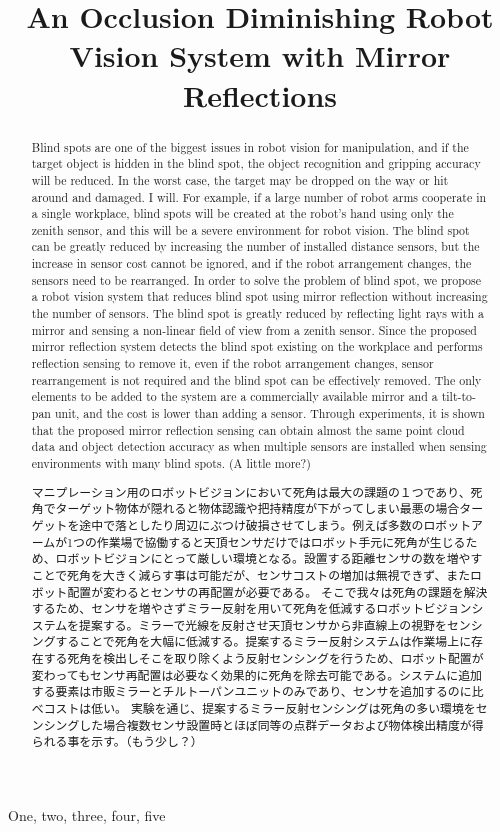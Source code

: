 \documentclass[xelatex,ja=standard]{bxjsarticle}
\title{An Occlusion Diminishing Robot Vision System with Mirror Reflections}
\begin{document}
\ninept
%
\maketitle
%
\begin{abstract}
Blind spots are one of the biggest issues in robot vision for manipulation, and if the target object is hidden in the blind spot, the object recognition and gripping accuracy will be reduced. In the worst case, the target may be dropped on the way or hit around and damaged. I will. For example, if a large number of robot arms cooperate in a single workplace, blind spots will be created at the robot's hand using only the zenith sensor, and this will be a severe environment for robot vision. The blind spot can be greatly reduced by increasing the number of installed distance sensors, but the increase in sensor cost cannot be ignored, and if the robot arrangement changes, the sensors need to be rearranged.
In order to solve the problem of blind spot, we propose a robot vision system that reduces blind spot using mirror reflection without increasing the number of sensors. The blind spot is greatly reduced by reflecting light rays with a mirror and sensing a non-linear field of view from a zenith sensor. Since the proposed mirror reflection system detects the blind spot existing on the workplace and performs reflection sensing to remove it, even if the robot arrangement changes, sensor rearrangement is not required and the blind spot can be effectively removed. The only elements to be added to the system are a commercially available mirror and a tilt-to-pan unit, and the cost is lower than adding a sensor.
Through experiments, it is shown that the proposed mirror reflection sensing can obtain almost the same point cloud data and object detection accuracy as when multiple sensors are installed when sensing environments with many blind spots. (A little more?)

マニプレーション用のロボットビジョンにおいて死角は最大の課題の１つであり、死角でターゲット物体が隠れると物体認識や把持精度が下がってしまい最悪の場合ターゲットを途中で落としたり周辺にぶつけ破損させてしまう。例えば多数のロボットアームが1つの作業場で協働すると天頂センサだけではロボット手元に死角が生じるため、ロボットビジョンにとって厳しい環境となる。設置する距離センサの数を増やすことで死角を大きく減らす事は可能だが、センサコストの増加は無視できず、またロボット配置が変わるとセンサの再配置が必要である。
そこで我々は死角の課題を解決するため、センサを増やさずミラー反射を用いて死角を低減するロボットビジョンシステムを提案する。ミラーで光線を反射させ天頂センサから非直線上の視野をセンシングすることで死角を大幅に低減する。提案するミラー反射システムは作業場上に存在する死角を検出しそこを取り除くよう反射センシングを行うため、ロボット配置が変わってもセンサ再配置は必要なく効果的に死角を除去可能である。システムに追加する要素は市販ミラーとチルトーパンユニットのみであり、センサを追加するのに比べコストは低い。
実験を通じ、提案するミラー反射センシングは死角の多い環境をセンシングした場合複数センサ設置時とほぼ同等の点群データおよび物体検出精度が得られる事を示す。（もう少し？）
\end{abstract}
%
\begin{keywords}
One, two, three, four, five
\end{keywords}
%
\end{document}
